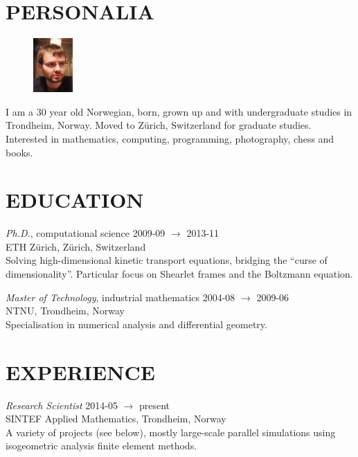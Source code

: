 \documentclass[line,margin]{res}
\newcommand{\zh}{Z\"{u}rich}
\begin{document}
\address{Høgreina 394, NO-7079 Flatåsen}
\address{+41 41 44 98 89, evfonn@gmail.com}


\begin{resume}

\section{PERSONALIA}

\begin{figure}
  \vspace{-0.6cm}
  \includegraphics[width=1.5cm]{photo.png}
\end{figure}

I am a 30 year old Norwegian, born, grown up and with undergraduate studies in Trondheim,
Norway. Moved to Zürich, Switzerland for graduate studies. Interested in mathematics, computing,
programming, photography, chess and books.


\section{EDUCATION} 

{\em Ph.D.}, computational science \hfill 2009-09 $\to$ 2013-11 \\
ETH \zh, \zh, Switzerland \\
Solving high-dimensional kinetic transport equations, bridging the ``curse of
dimensionality''. Particular focus on Shearlet frames and the Boltzmann equation.

{\em Master of Technology}, industrial mathematics \hfill 2004-08 $\to$ 2009-06 \\
NTNU, Trondheim, Norway \\
Specialisation in numerical analysis and differential geometry.


\section{EXPERIENCE}

{\em Research Scientist} \hfill 2014-05 $\to$ present \\
SINTEF Applied Mathematics, Trondheim, Norway \\
A variety of projects (see below), mostly large-scale parallel simulations using
isogeometric analysis finite element methods.


\end{resume}
\end{document}

